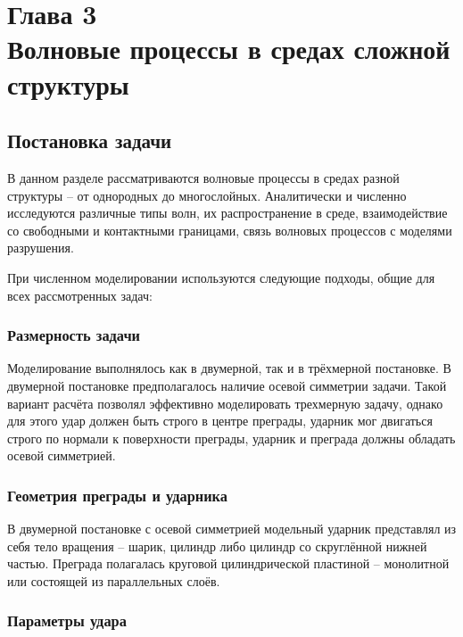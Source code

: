 \section*{Глава 3\\Волновые процессы в средах сложной структуры}
\setcounter{section}{3}
\setcounter{subsection}{0}

\subsection{Постановка задачи}

В данном разделе рассматриваются волновые процессы в средах разной структуры -- от однородных до многослойных. Аналитически и численно исследуются различные типы волн, их распространение в среде, взаимодействие со свободными и контактными границами, связь волновых процессов с моделями разрушения.

При численном моделировании используются следующие подходы, общие для всех рассмотренных задач:

\subsubsection*{Размерность задачи}

Моделирование выполнялось как в двумерной, так и в трёхмерной постановке. В двумерной постановке предполагалось наличие осевой симметрии задачи. Такой вариант расчёта позволял эффективно моделировать трехмерную задачу, однако для этого удар должен быть строго в центре преграды, ударник мог двигаться строго по нормали к поверхности преграды, ударник и преграда должны обладать осевой симметрией.

\subsubsection*{Геометрия преграды и ударника}

В двумерной постановке с осевой симметрией модельный ударник представлял из себя тело вращения -- шарик, цилиндр либо цилиндр со скруглённой нижней частью. Преграда полагалась круговой цилиндрической пластиной -- монолитной или состоящей из параллельных слоёв.

\subsubsection*{Параметры удара}

